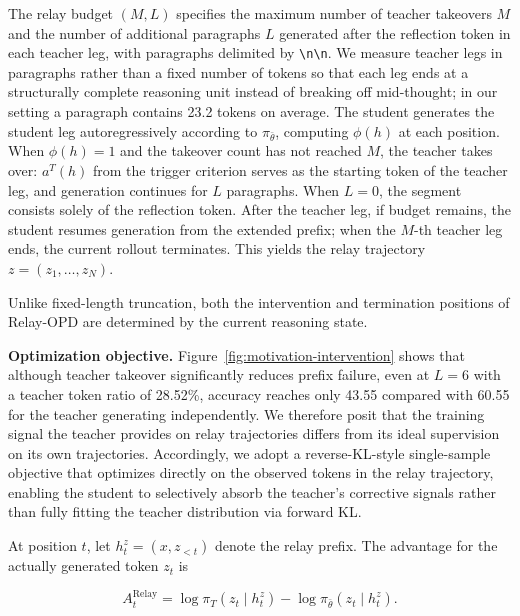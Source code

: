 \documentclass{article} %
\begin{document}
The relay budget $(M,L)$ specifies the maximum number of teacher takeovers $M$ and the number of additional paragraphs $L$ generated after the reflection token in each teacher leg, with paragraphs delimited by \texttt{\textbackslash{}n\textbackslash{}n}. We measure teacher legs in paragraphs rather than a fixed number of tokens so that each leg ends at a structurally complete reasoning unit instead of breaking off mid-thought; in our setting a paragraph contains 23.2 tokens on average. The student generates the student leg autoregressively according to $\pi_{\bar\theta}$, computing $\phi(h)$ at each position. When $\phi(h)=1$ and the takeover count has not reached $M$, the teacher takes over: $a^T(h)$ from the trigger criterion serves as the starting token of the teacher leg, and generation continues for $L$ paragraphs. When $L=0$, the segment consists solely of the reflection token. After the teacher leg, if budget remains, the student resumes generation from the extended prefix; when the $M$-th teacher leg ends, the current rollout terminates. This yields the relay trajectory $z=(z_1,\ldots,z_N)$.

Unlike fixed-length truncation, both the intervention and termination positions of Relay-OPD are determined by the current reasoning state.\par

\textbf{Optimization objective.} Figure~\ref{fig:motivation-intervention} shows that although teacher takeover significantly reduces prefix failure, even at $L=6$ with a teacher token ratio of 28.52\%, accuracy reaches only 43.55 compared with 60.55 for the teacher generating independently. We therefore posit that the training signal the teacher provides on relay trajectories differs from its ideal supervision on its own trajectories. Accordingly, we adopt a reverse-KL-style single-sample objective that optimizes directly on the observed tokens in the relay trajectory, enabling the student to selectively absorb the teacher's corrective signals rather than fully fitting the teacher distribution via forward KL.\par

At position $t$, let $h_t^z=(x,z_{<t})$ denote the relay prefix. The advantage for the actually generated token $z_t$ is\par

\begin{equation}
A_t^{\mathrm{Relay}}
=\log\pi_T(z_t\mid h_t^z)
-\log\pi_{\bar\theta}(z_t\mid h_t^z).
\end{equation}
\end{document}
